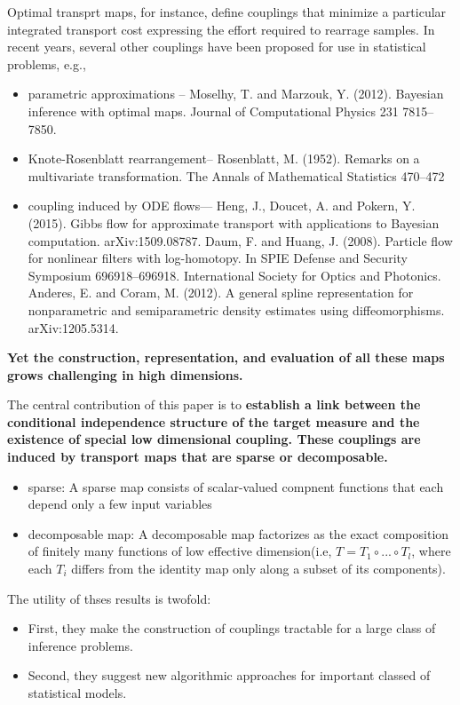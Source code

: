 \documentclass[a4paper, 11pt]{article}
\begin{document}
\begin{CJK}{UTF8}{gbsn}
Optimal transprt maps, for instance, define couplings that minimize a particular integrated transport cost expressing the effort required to rearrage samples. In recent years, several other couplings have been proposed for use in statistical problems, e.g.,

\begin{itemize}
\item parametric approximations -- Moselhy, T. and Marzouk, Y. (2012). Bayesian inference with optimal maps. Journal of Computational Physics 231 7815–7850.
\item Knote-Rosenblatt rearrangement-- Rosenblatt, M. (1952). Remarks on a multivariate transformation. The Annals of Mathematical Statistics 470–472
\item coupling induced by ODE flows--- Heng, J., Doucet, A. and Pokern, Y. (2015). Gibbs flow for approximate transport with applications to Bayesian computation. arXiv:1509.08787.
Daum, F. and Huang, J. (2008). Particle flow for nonlinear filters with log-homotopy. In SPIE Defense and Security Symposium 696918–696918. International Society for Optics and Photonics.
Anderes, E. and Coram, M. (2012). A general spline representation for nonparametric and semiparametric density estimates using diffeomorphisms. arXiv:1205.5314.
\end{itemize}

\textbf{Yet the construction, representation, and evaluation of all these maps grows challenging in high dimensions.}

The central contribution of this paper is to \textbf{establish a link between the conditional independence structure of the target measure and the existence of special low dimensional coupling. These couplings are induced by transport maps that are sparse or decomposable.}

\begin{itemize}
\item sparse: A sparse map consists of scalar-valued compnent functions that each depend only a few input variables
\item decomposable map: A decomposable map factorizes as the exact composition of finitely many functions of low effective dimension(i.e, $T = T_1 \circ ... \circ T_l$, where each $T_i$ differs from the identity map only along a subset of its components).
\end{itemize}

The utility of thses results is twofold:
\begin{itemize}
\item First, they make the construction of couplings tractable for a large class of inference problems.
\item Second, they suggest new algorithmic approaches for important classed of statistical models.
\end{itemize}


\end{CJK}
\end{document}
